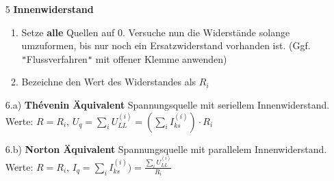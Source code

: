   \iend
\begin{itemize}

  \item[5] \textbf{Innenwiderstand}
  \begin{enumerate}
    \item Setze \textbf{alle} Quellen auf 0. Versuche nun die Widerstände solange umzuformen, bis nur noch ein Ersatzwiderstand vorhanden ist. (Ggf. \texttt{"}Flussverfahren\texttt{"} mit offener Klemme anwenden)
    \item Bezeichne den Wert des Widerstandes als $R_i$
  \end{enumerate}
  \item[6.a)] \textbf{Thévenin Äquivalent} Spannungsquelle mit seriellem Innenwiderstand. \\
  Werte: $\displaystyle   R= R_i$, $U_q = \sum_i U_{LL}^{(i)} = (\sum_i I_{ks}^{(i)})\cdot R_i$

  \item[6.b)] \textbf{Norton Äquivalent} Spannungsquelle mit parallelem Innenwiderstand. \\
  Werte: $\displaystyle  R= R_i$, $I_q = \sum_i I_{ks}^{(i)}) = \frac{\sum_i U_{LL}^{(i)}}{R_i}$

  \end{itemize}
